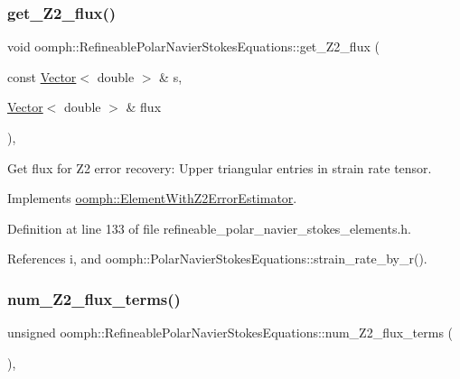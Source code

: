 \subsubsection{\texorpdfstring{get\+\_\+\+Z2\+\_\+flux()}{get\_Z2\_flux()}}
{\footnotesize\ttfamily void oomph\+::\+Refineable\+Polar\+Navier\+Stokes\+Equations\+::get\+\_\+\+Z2\+\_\+flux (\begin{DoxyParamCaption}\item[{const \hyperlink{classoomph_1_1Vector}{Vector}$<$ double $>$ \&}]{s,  }\item[{\hyperlink{classoomph_1_1Vector}{Vector}$<$ double $>$ \&}]{flux }\end{DoxyParamCaption})\hspace{0.3cm}{\ttfamily [inline]}, {\ttfamily [virtual]}}



Get \textquotesingle{}flux\textquotesingle{} for Z2 error recovery\+: Upper triangular entries in strain rate tensor. 



Implements \hyperlink{classoomph_1_1ElementWithZ2ErrorEstimator_a5688ff5f546d81771cabad82ca5a7556}{oomph\+::\+Element\+With\+Z2\+Error\+Estimator}.



Definition at line 133 of file refineable\+\_\+polar\+\_\+navier\+\_\+stokes\+\_\+elements.\+h.



References i, and oomph\+::\+Polar\+Navier\+Stokes\+Equations\+::strain\+\_\+rate\+\_\+by\+\_\+r().

\mbox{\label{classoomph_1_1RefineablePolarNavierStokesEquations_a44c3c20fb5ac6268dfd7671d83695308}} 
\subsubsection{\texorpdfstring{num\+\_\+\+Z2\+\_\+flux\+\_\+terms()}{num\_Z2\_flux\_terms()}}
{\footnotesize\ttfamily unsigned oomph\+::\+Refineable\+Polar\+Navier\+Stokes\+Equations\+::num\+\_\+\+Z2\+\_\+flux\+\_\+terms (\begin{DoxyParamCaption}{ }\end{DoxyParamCaption})\hspace{0.3cm}{\ttfamily [inline]}, {\ttfamily [virtual]}}



